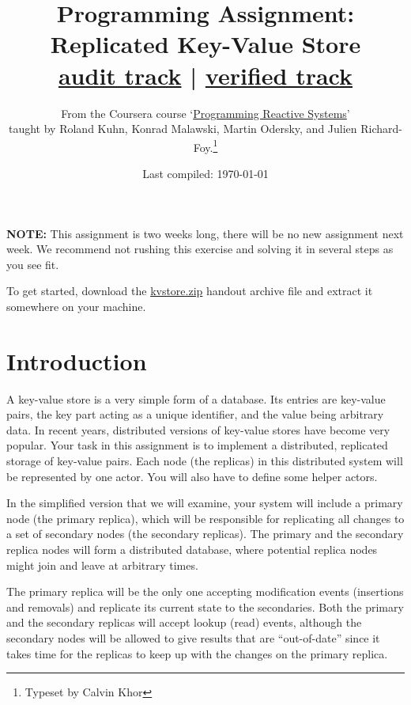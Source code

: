 \documentclass{article}
\begin{document}
\title{Programming Assignment: Replicated Key-Value Store \\ \small \href{https://www.coursera.org/learn/scala-akka-reactive/programming/dt8Ku/replicated-key-value-store-audit-track}{audit track} | \href{https://www.coursera.org/learn/scala-akka-reactive/programming/cVXJU/replicated-key-value-store-verified-track}{verified track} }
\author{   From the Coursera course `\href{https://www.coursera.org/learn/scala-akka-reactive/home/welcome}{Programming Reactive Systems}' \\ taught by Roland Kuhn, Konrad Malawski, Martin Odersky, and Julien Richard-Foy.\footnote{Typeset by Calvin Khor}  }

\date{Last compiled: \today}
\maketitle
\tableofcontents
\newpage 
\textbf{NOTE:} This assignment is two weeks long, there will  be no new assignment next week. We recommend not rushing this exercise  and solving it in several steps as you see fit.

To get started,
download the \href{https://moocs.scala-lang.org/~dockermoocs/handouts/scala-3/kvstore.zip}{kvstore.zip}
handout archive file and extract it somewhere on your machine.

\section{Introduction}\label{s:intro}
A key-value store is a very simple form of a database. Its entries are key-value pairs, the key part acting as a unique identifier, and the value being arbitrary data. In recent years, distributed versions of key-value stores have become very popular. Your task in this assignment is to implement a distributed, replicated storage of key-value pairs. Each node (the replicas) in this distributed system will be represented by one actor. You will also have to define some helper actors.

In the simplified version that we will examine, your system will include a primary node (the primary replica), which will be responsible for replicating all changes to a set of secondary nodes (the secondary replicas). The primary and the secondary replica nodes will form a distributed database, where potential replica nodes might join and leave at arbitrary times.

The primary replica will be the only one accepting modification events (insertions and removals) and replicate its current state to the secondaries. Both the primary and the secondary replicas will accept lookup (read) events, although the secondary nodes will be allowed to give results that are ``out-of-date'' since it takes time for the replicas to keep up with the changes on the primary replica.
\end{document}
